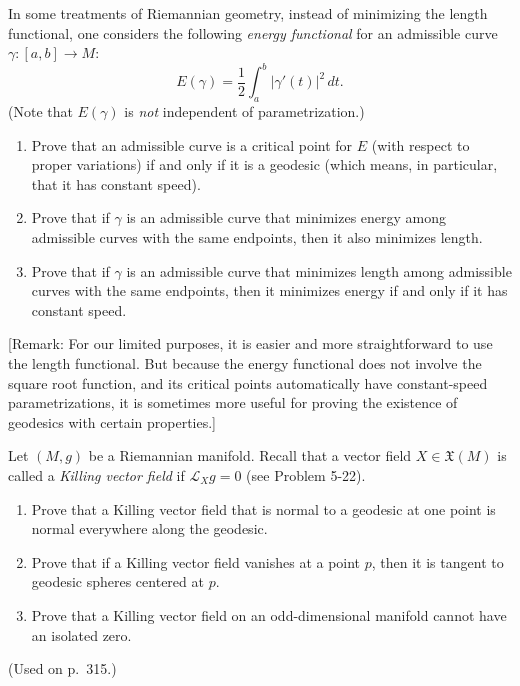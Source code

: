 \begin{exercise}
\label{prob:energy-functional}

In some treatments of Riemannian geometry, instead of minimizing the length functional, one considers the following \emph{energy functional} for an admissible curve $\gamma: [a,b] \to M$:
\[
E(\gamma) = \frac{1}{2} \int_a^b |\gamma'(t)|^2 \, dt.
\]
(Note that $E(\gamma)$ is \emph{not} independent of parametrization.)
\begin{enumerate}
\item[(a)] Prove that an admissible curve is a critical point for $E$ (with respect to proper variations) if and only if it is a geodesic (which means, in particular, that it has constant speed).
\item[(b)] Prove that if $\gamma$ is an admissible curve that minimizes energy among admissible curves with the same endpoints, then it also minimizes length.
\item[(c)] Prove that if $\gamma$ is an admissible curve that minimizes length among admissible curves with the same endpoints, then it minimizes energy if and only if it has constant speed.
\end{enumerate}
[Remark: For our limited purposes, it is easier and more straightforward to use the length functional. But because the energy functional does not involve the square root function, and its critical points automatically have constant-speed parametrizations, it is sometimes more useful for proving the existence of geodesics with certain properties.]
\end{exercise}

\begin{exercise}
\label{prob:killing-vector-field-properties}

Let $(M, g)$ be a Riemannian manifold. Recall that a vector field $X \in \mathfrak{X}(M)$ is called a \emph{Killing vector field} if $\mathcal{L}_X g = 0$ (see Problem 5-22).
\begin{enumerate}
\item[(a)] Prove that a Killing vector field that is normal to a geodesic at one point is normal everywhere along the geodesic.
\item[(b)] Prove that if a Killing vector field vanishes at a point $p$, then it is tangent to geodesic spheres centered at $p$.
\item[(c)] Prove that a Killing vector field on an odd-dimensional manifold cannot have an isolated zero.
\end{enumerate}
(Used on p.\ 315.)
\end{exercise}

